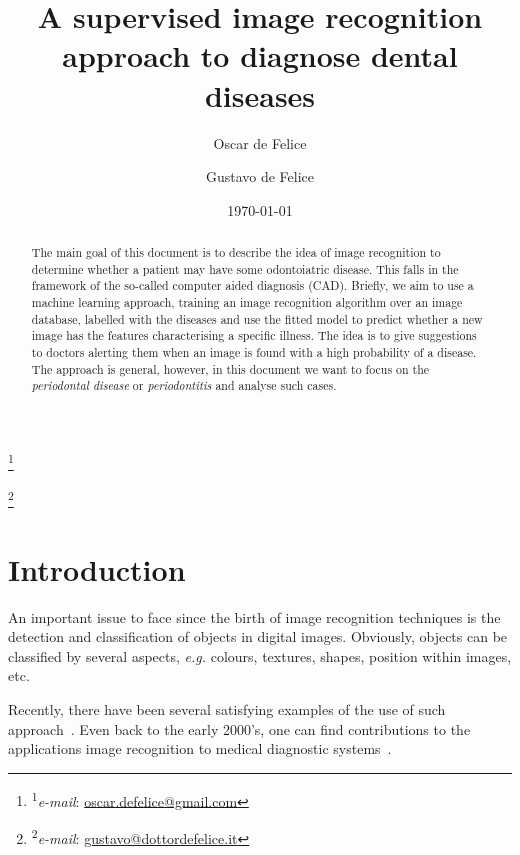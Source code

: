 \documentclass[a4paper, 10pt, superscriptaddress, nofootinbib, showkeys, notitlepage]{revtex4-1}
\begin{document}

\author{Oscar de Felice}
	{\let\thefootnote\relax\footnote{\hspace{-4ex}\textsuperscript{1}\emph{e-mail}: \href{mailto:oscar.defelice@gmail.com}{oscar.defelice@gmail.com}}}
\author{Gustavo de Felice}
	{\let\thefootnote\relax\footnote{\hspace{-4ex}\textsuperscript{2}\emph{e-mail}: \href{mailto:gustavo@dottordefelice.it}{gustavo@dottordefelice.it}}}



\date{\today}
%
%
%
\title{A supervised image recognition approach to diagnose dental diseases}
%
\begin{abstract}
%
	The main goal of this document is to describe the idea of image recognition to determine whether a patient may have some odontoiatric disease.
	This falls in the framework of the so-called computer aided diagnosis (\textsc{CAD}).
	Briefly, we aim to use a machine learning approach, training an image recognition algorithm over an image database, labelled with the diseases and use the fitted model to predict whether a new image has the features characterising a specific illness. The idea is to give suggestions to doctors alerting them when an image is found with a high probability of a disease.
	The approach is general, however, in this document we want to focus on the \emph{periodontal disease} or \emph{periodontitis} and analyse such cases.
%
\end{abstract}
%
\maketitle
%

\section*{Introduction}
	An important issue to face since the birth of image recognition techniques is the detection and classification of objects in digital images. 
	Obviously, objects can be classified by several aspects, \emph{e.g.} colours, textures, shapes, position within images, etc.
	
	Recently, there have been several satisfying examples of the use of such approach~\cite{castanon2007, Arena2003}. 
	Even back to the early 2000's, one can find contributions to the applications image recognition to medical diagnostic systems~\cite{Comaniciu1999, Jain2000}.
\end{document}
